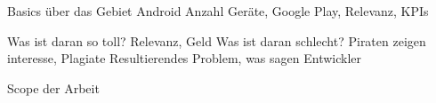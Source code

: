 Basics über das Gebiet Android
Anzahl Geräte, Google Play, Relevanz, KPIs

Was ist daran so toll?
Relevanz, Geld
Was ist daran schlecht?
Piraten zeigen interesse, Plagiate
Resultierendes Problem, was sagen Entwickler

Scope der Arbeit
